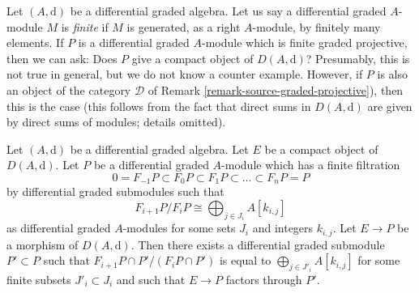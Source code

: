 \begin{remark}
\label{remark-graded-projective-is-compact}
Let $(A, \text{d})$ be a differential graded algebra. Let us say a
differential graded $A$-module $M$ is {\it finite} if $M$ is generated,
as a right $A$-module, by finitely many elements. If $P$ is a
differential graded $A$-module which is finite graded projective,
then we can ask: Does $P$ give a compact object of $D(A, \text{d})$?
Presumably, this is not true in general, but we do not know a
counter example. However, if $P$ is also an object of the category
$\mathcal{D}$ of Remark \ref{remark-source-graded-projective}),
then this is the case (this follows from the fact that direct sums
in $D(A, \text{d})$ are given by direct sums of modules; details omitted).
\end{remark}

\begin{lemma}
\label{lemma-factor-through-nicer}
Let $(A, \text{d})$ be a differential graded algebra. Let $E$ be a compact
object of $D(A, \text{d})$. Let $P$ be a differential graded $A$-module
which has a finite filtration
$$
0 = F_{-1}P \subset F_0P \subset F_1P \subset \ldots \subset F_nP = P
$$
by differential graded submodules such that
$$
F_{i + 1}P/F_iP \cong \bigoplus\nolimits_{j \in J_i} A[k_{i, j}]
$$
as differential graded $A$-modules for some sets $J_i$ and integers $k_{i, j}$.
Let $E \to P$ be a morphism of $D(A, \text{d})$.
Then there exists a differential graded submodule $P' \subset P$ such that
$F_{i + 1}P \cap P'/(F_iP \cap P')$ is equal to
$\bigoplus_{j \in J'_i} A[k_{i, j}]$ for some finite subsets
$J'_i \subset J_i$ and such that $E \to P$ factors through $P'$.
\end{lemma}

